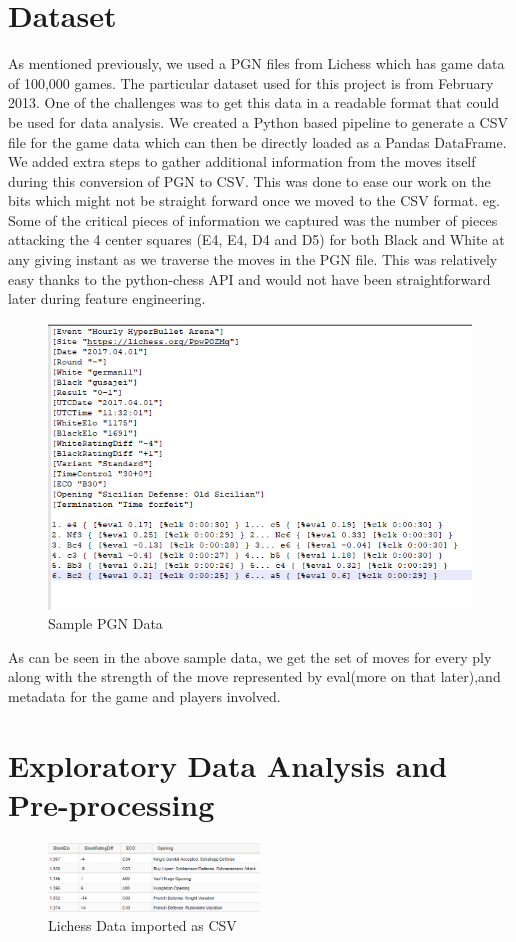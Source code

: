 \documentclass[11pt,a4paper]{article}
\begin{document}
\section{Dataset}
As mentioned previously, we used a PGN files from Lichess which has game data of 100,000 games. The particular dataset used for this project is from February 2013. One of the challenges was to get this data in a readable format that could be used for data analysis. We created a Python based pipeline to generate a CSV file for the game data which can then be directly loaded as a Pandas DataFrame. We added extra steps to gather additional information from the moves itself during this conversion of PGN to CSV. This was done to ease our work on the bits which might not be straight forward once we moved to the CSV format. eg. Some  of the critical pieces of information we captured was the number of pieces attacking the 4 center squares (E4, E4, D4 and D5) for both Black and White at any giving instant as we traverse the moves in the PGN file. This was relatively easy thanks to the python-chess API\cite{pythonchess} and would not have been straightforward later during feature engineering.
\begin{figure}[!ht]
    \centering
    \includegraphics[scale=0.5]{PGN_data.PNG}
    \caption{Sample PGN Data}
\end{figure}

As can be seen in the above sample data, we get the set of moves for every ply along with the strength of the move represented by eval(more on that later),and metadata for the game and players involved.  

\section{Exploratory Data Analysis and Pre-processing}
\begin{figure}[h]
\centering
\includegraphics[width=0.5\textwidth]{Dataset.PNG}
\caption{Lichess Data imported as CSV}
\end{figure}
\end{document}
